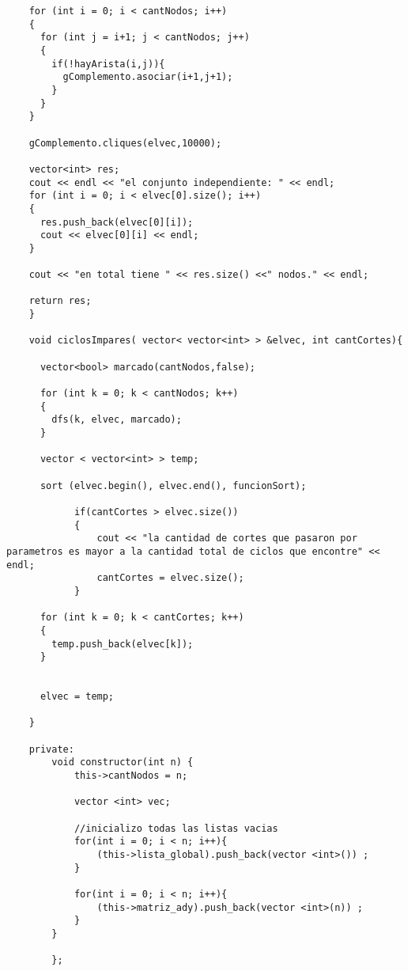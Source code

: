 \begin{lstlisting}
    for (int i = 0; i < cantNodos; i++)
    {
      for (int j = i+1; j < cantNodos; j++)
      {
        if(!hayArista(i,j)){
          gComplemento.asociar(i+1,j+1);
        }
      }
    }
    
    gComplemento.cliques(elvec,10000);
    
    vector<int> res;
    cout << endl << "el conjunto independiente: " << endl;
    for (int i = 0; i < elvec[0].size(); i++)
    {
      res.push_back(elvec[0][i]);
      cout << elvec[0][i] << endl;
    }
    
    cout << "en total tiene " << res.size() <<" nodos." << endl;
    
    return res;
    }

    void ciclosImpares( vector< vector<int> > &elvec, int cantCortes){
     
      vector<bool> marcado(cantNodos,false);
      
      for (int k = 0; k < cantNodos; k++)
      {
        dfs(k, elvec, marcado);
      }
      
      vector < vector<int> > temp;
      
      sort (elvec.begin(), elvec.end(), funcionSort); 
      
            if(cantCortes > elvec.size())
            {
                cout << "la cantidad de cortes que pasaron por parametros es mayor a la cantidad total de ciclos que encontre" << endl;
                cantCortes = elvec.size();
            }

      for (int k = 0; k < cantCortes; k++)
      {
        temp.push_back(elvec[k]);
      }

            
      elvec = temp;
      
    }
       
    private:
        void constructor(int n) {
            this->cantNodos = n;

            vector <int> vec;

            //inicializo todas las listas vacias
            for(int i = 0; i < n; i++){
                (this->lista_global).push_back(vector <int>()) ;
            }

            for(int i = 0; i < n; i++){
                (this->matriz_ady).push_back(vector <int>(n)) ;
            }
        }

        };

\end{lstlisting}

